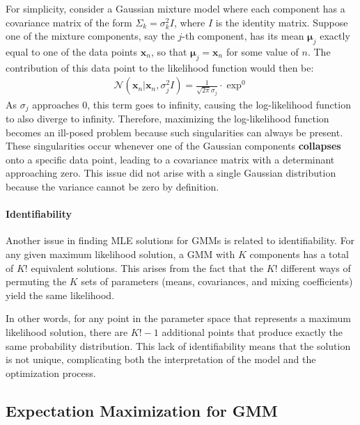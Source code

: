 For simplicity, consider a Gaussian mixture model where each component has a covariance matrix of the form \( \Sigma_k = \sigma^2_k I \), where \( I \) is the identity matrix. Suppose one of the mixture components, say the \( j \)-th component, has its mean \( \boldsymbol{\mu}_j \) exactly equal to one of the data points \( \mathbf{x}_n \), so that \( \boldsymbol{\mu}_j = \mathbf{x}_n \) for some value of \( n \). The contribution of this data point to the likelihood function would then be:
\begin{align*}
	\mathcal{N}(\mathbf{x}_n | \mathbf{x}_n, \sigma^2_j I) = \frac{1}{\sqrt{2\pi} \sigma_j} \cdot \exp^0
\end{align*}
As \( \sigma_j \) approaches 0, this term goes to infinity, causing the log-likelihood function to also diverge to infinity. Therefore, maximizing the log-likelihood function becomes an ill-posed problem because such singularities can always be present. These singularities occur whenever one of the Gaussian components \textbf{collapses} onto a specific data point, leading to a covariance matrix with a determinant approaching zero. This issue did not arise with a single Gaussian distribution because the variance cannot be zero by definition.

\paragraph{Identifiability} Another issue in finding MLE solutions for GMMs is related to identifiability. For any given maximum likelihood solution, a GMM with \( K \) components has a total of \( K! \) equivalent solutions. This arises from the fact that the \( K! \) different ways of permuting the \( K \) sets of parameters (means, covariances, and mixing coefficients) yield the same likelihood.

In other words, for any point in the parameter space that represents a maximum likelihood solution, there are \( K! - 1 \) additional points that produce exactly the same probability distribution. This lack of identifiability means that the solution is not unique, complicating both the interpretation of the model and the optimization process.

\subsection{Expectation Maximization for GMM}


